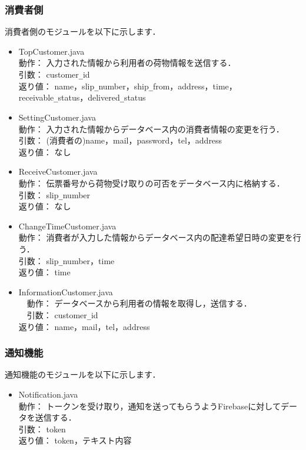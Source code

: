 \documentclass[a4j,titlepage]{jarticle}
\begin{document}
\subsubsection{消費者側}
消費者側のモジュールを以下に示します．
\begin{itemize}
\item TopCustomer.java\\
  動作： 入力された情報から利用者の荷物情報を送信する．\\
  引数： customer\verb|_|id\\
  返り値： name，slip\verb|_|number，ship\verb|_|from，address，time，receivable\verb|_|status，delivered\verb|_|status
\item SettingCustomer.java\\
  動作： 入力された情報からデータベース内の消費者情報の変更を行う．\\
  引数： (消費者の)name，mail，password，tel，address\\
  返り値： なし
\item ReceiveCustomer.java\\
  動作： 伝票番号から荷物受け取りの可否をデータベース内に格納する．\\
  引数： slip\verb|_|number\\
  返り値： なし
\item ChangeTimeCustomer.java\\
  動作： 消費者が入力した情報からデータベース内の配達希望日時の変更を行う．\\
  引数： slip\verb|_|number，time\\
  返り値： time
  \item InformationCustomer.java\\
　動作： データベースから利用者の情報を取得し，送信する．\\
　引数： customer\verb|_|id\\
返り値： name，mail，tel，address
\end{itemize}

\subsubsection{通知機能}
通知機能のモジュールを以下に示します．
\begin{itemize}
\item Notification.java\\
  動作： トークンを受け取り，通知を送ってもらうようFirebaseに対してデータを送信する．\\
  引数： token\\
  返り値： token，テキスト内容
\end{itemize}
\end{document}

